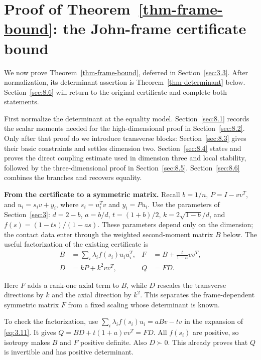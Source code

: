 \section{Proof of Theorem~\ref{thm-frame-bound}: the John-frame certificate bound}\label{sec:8}

We now prove Theorem~\ref{thm-frame-bound}, deferred in Section~\ref{sec:3.3}. After normalization,
its determinant assertion is Theorem~\ref{thm-determinant} below. Section~\ref{sec:8.6} will return to
the original certificate and complete both statements.

First normalize the determinant at the equality model. Section~\ref{sec:8.1} records
the scalar moments needed for the high-dimensional proof in Section~\ref{sec:8.2}.
Only after that proof do we introduce transverse blocks: Section~\ref{sec:8.3} gives
their basic constraints and settles dimension two. Section~\ref{sec:8.4} states and
proves the direct coupling estimate used in dimension three and local
stability, followed by the three-dimensional proof in Section~\ref{sec:8.5}.
Section~\ref{sec:8.6} combines the branches and recovers equality.

\textbf{From the certificate to a symmetric matrix.} Recall $b=1/n$,
$P=I-vv^T$, and $u_i=s_iv+y_i$, where $s_i=u_i^Tv$ and $y_i=Pu_i$.
Use the parameters of Section~\ref{sec:3}:
$d=2-b$, $a=b/d$, $t=(1+b)/2$, $k=2\sqrt{1-b}/d$, and
$f(s)=(1-ts)/(1-as)$. These parameters depend only on the dimension; the
contact data enter through the weighted second-moment matrix $B$ below.
The useful factorization of the existing certificate is
\begin{equation}\label{eq:8.1}
\begin{aligned}
B&=\sum_i\lambda_i f(s_i)u_iu_i^T,&
F&=B+\frac{t}{1-a}vv^T,\\
D&=kP+k^2vv^T,&Q&=FD.
\end{aligned}
\end{equation}

Here $F$ adds a rank-one axial term to $B$, while $D$ rescales the transverse
directions by $k$ and the axial direction by $k^2$. This separates the
frame-dependent symmetric matrix $F$ from a fixed scaling whose determinant
is known.

To check the factorization, use
$\sum_i\lambda_i f(s_i)u_i=aBv-tv$ in the expansion of \eqref{eq:3.11}.
It gives $Q=BD+t(1+a)vv^T=FD$. All $f(s_i)$ are positive, so isotropy
makes $B$ and $F$ positive definite. Also $D\succ0$. This already proves
that $Q$ is invertible and has positive determinant.

